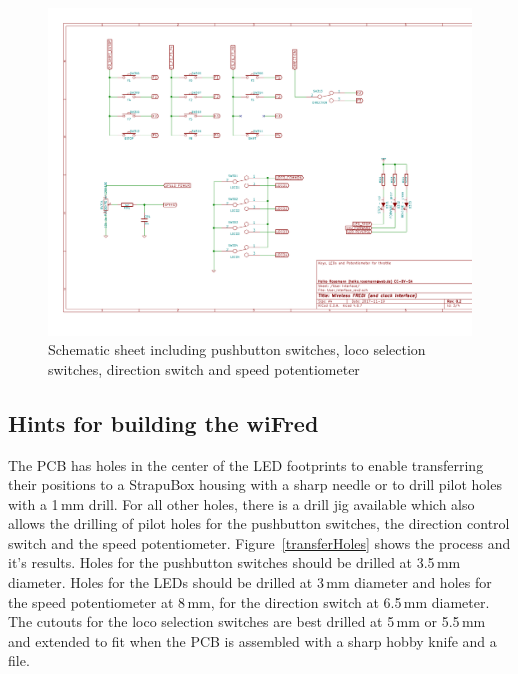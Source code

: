 \documentclass[11pt,a4paper]{scrartcl}
\begin{document}
\begin{figure}[tbh]
  \centering
  \includegraphics[width=\textwidth]{images/User_interface_rev2-User_Interface}
  \caption{Schematic sheet including pushbutton switches, loco selection switches, direction switch and speed potentiometer}
  \label{schematicPage4}
\end{figure}

\subsection{Hints for building the wiFred}

The PCB has holes in the center of the LED footprints to enable transferring their positions to a StrapuBox housing with a sharp needle or to drill pilot holes with a 1\,mm drill. For all other holes, there is a drill jig available which also allows the drilling of pilot holes for the pushbutton switches, the direction control switch and the speed potentiometer. Figure~\ref{transferHoles} shows the process and it's results. Holes for the pushbutton switches should be drilled at 3.5\,mm diameter. Holes for the LEDs should be drilled at 3\,mm diameter and holes for the speed potentiometer at 8\,mm, for the direction switch at 6.5\,mm diameter. The cutouts for the loco selection switches are best drilled at 5\,mm or 5.5\,mm and extended to fit when the PCB is assembled with a sharp hobby knife and a file.
\end{document}
